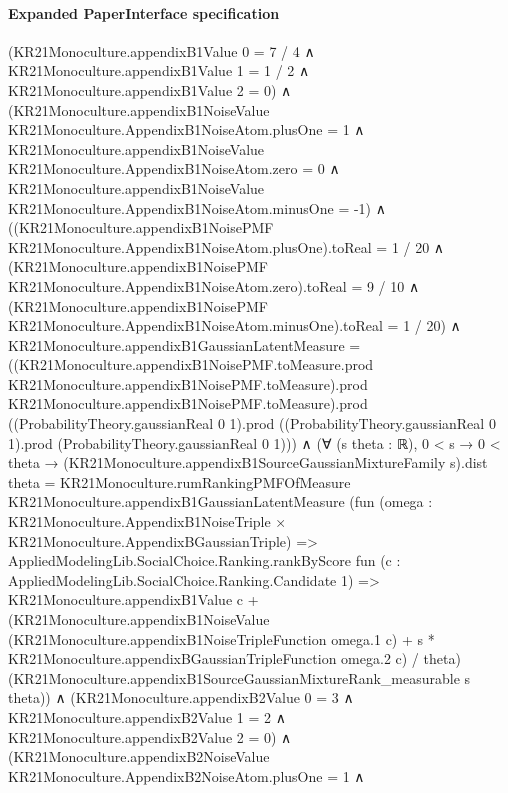 \documentclass[10pt]{article}
\begin{document}
\paragraph{Expanded PaperInterface specification}
\begin{ReviewVerbatim}
(KR21Monoculture.appendixB1Value 0 = 7 / 4 ∧
    KR21Monoculture.appendixB1Value 1 = 1 / 2 ∧ KR21Monoculture.appendixB1Value 2 = 0) ∧
  (KR21Monoculture.appendixB1NoiseValue KR21Monoculture.AppendixB1NoiseAtom.plusOne = 1 ∧
      KR21Monoculture.appendixB1NoiseValue KR21Monoculture.AppendixB1NoiseAtom.zero = 0 ∧
        KR21Monoculture.appendixB1NoiseValue KR21Monoculture.AppendixB1NoiseAtom.minusOne = -1) ∧
    ((KR21Monoculture.appendixB1NoisePMF KR21Monoculture.AppendixB1NoiseAtom.plusOne).toReal = 1 / 20 ∧
        (KR21Monoculture.appendixB1NoisePMF KR21Monoculture.AppendixB1NoiseAtom.zero).toReal = 9 / 10 ∧
          (KR21Monoculture.appendixB1NoisePMF KR21Monoculture.AppendixB1NoiseAtom.minusOne).toReal = 1 / 20) ∧
      KR21Monoculture.appendixB1GaussianLatentMeasure =
          ((KR21Monoculture.appendixB1NoisePMF.toMeasure.prod KR21Monoculture.appendixB1NoisePMF.toMeasure).prod
                KR21Monoculture.appendixB1NoisePMF.toMeasure).prod
            ((ProbabilityTheory.gaussianReal 0 1).prod
              ((ProbabilityTheory.gaussianReal 0 1).prod (ProbabilityTheory.gaussianReal 0 1))) ∧
        (∀ (s theta : ℝ),
            0 < s →
              0 < theta →
                (KR21Monoculture.appendixB1SourceGaussianMixtureFamily s).dist theta =
                  KR21Monoculture.rumRankingPMFOfMeasure KR21Monoculture.appendixB1GaussianLatentMeasure
                    (fun (omega : KR21Monoculture.AppendixB1NoiseTriple × KR21Monoculture.AppendixBGaussianTriple) =>
                      AppliedModelingLib.SocialChoice.Ranking.rankByScore
                        fun (c : AppliedModelingLib.SocialChoice.Ranking.Candidate 1) =>
                        KR21Monoculture.appendixB1Value c +
                          (KR21Monoculture.appendixB1NoiseValue
                                (KR21Monoculture.appendixB1NoiseTripleFunction omega.1 c) +
                              s * KR21Monoculture.appendixBGaussianTripleFunction omega.2 c) /
                            theta)
                    (KR21Monoculture.appendixB1SourceGaussianMixtureRank_measurable s theta)) ∧
          (KR21Monoculture.appendixB2Value 0 = 3 ∧
              KR21Monoculture.appendixB2Value 1 = 2 ∧ KR21Monoculture.appendixB2Value 2 = 0) ∧
            (KR21Monoculture.appendixB2NoiseValue KR21Monoculture.AppendixB2NoiseAtom.plusOne = 1 ∧

\end{ReviewVerbatim}
\end{document}
